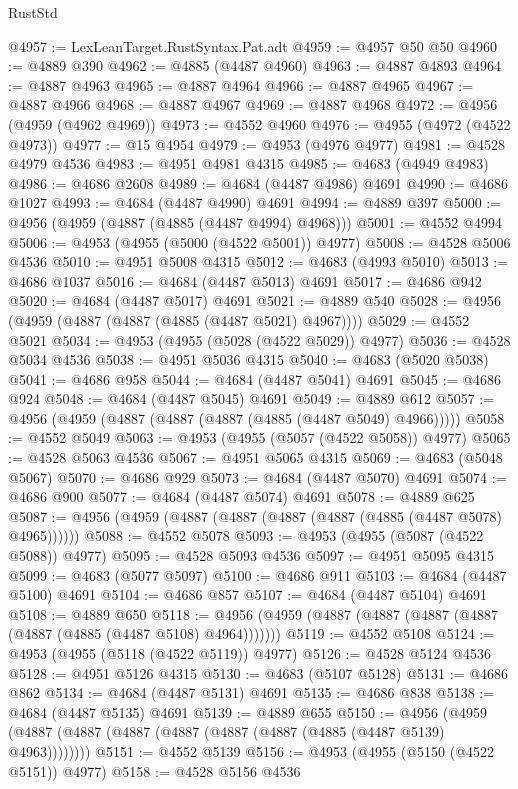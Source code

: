 \begin{lexlean}{RustStd}
\begin{coremodule}
@4957 := LexLeanTarget.RustSyntax.Pat.adt
@4959 := @4957 @50 @50
@4960 := @4889 @390
@4962 := @4885 (@4487 @4960)
@4963 := @4887 @4893
@4964 := @4887 @4963
@4965 := @4887 @4964
@4966 := @4887 @4965
@4967 := @4887 @4966
@4968 := @4887 @4967
@4969 := @4887 @4968
@4972 := @4956 (@4959 (@4962 @4969))
@4973 := @4552 @4960
@4976 := @4955 (@4972 (@4522 @4973))
@4977 := @15 @4954
@4979 := @4953 (@4976 @4977)
@4981 := @4528 @4979 @4536
@4983 := @4951 @4981 @4315
@4985 := @4683 (@4949 @4983)
@4986 := @4686 @2608
@4989 := @4684 (@4487 @4986) @4691
@4990 := @4686 @1027
@4993 := @4684 (@4487 @4990) @4691
@4994 := @4889 @397
@5000 := @4956 (@4959 (@4887 (@4885 (@4487 @4994) @4968)))
@5001 := @4552 @4994
@5006 := @4953 (@4955 (@5000 (@4522 @5001)) @4977)
@5008 := @4528 @5006 @4536
@5010 := @4951 @5008 @4315
@5012 := @4683 (@4993 @5010)
@5013 := @4686 @1037
@5016 := @4684 (@4487 @5013) @4691
@5017 := @4686 @942
@5020 := @4684 (@4487 @5017) @4691
@5021 := @4889 @540
@5028 := @4956 (@4959 (@4887 (@4887 (@4885 (@4487 @5021) @4967))))
@5029 := @4552 @5021
@5034 := @4953 (@4955 (@5028 (@4522 @5029)) @4977)
@5036 := @4528 @5034 @4536
@5038 := @4951 @5036 @4315
@5040 := @4683 (@5020 @5038)
@5041 := @4686 @958
@5044 := @4684 (@4487 @5041) @4691
@5045 := @4686 @924
@5048 := @4684 (@4487 @5045) @4691
@5049 := @4889 @612
@5057 := @4956 (@4959 (@4887 (@4887 (@4887 (@4885 (@4487 @5049) @4966)))))
@5058 := @4552 @5049
@5063 := @4953 (@4955 (@5057 (@4522 @5058)) @4977)
@5065 := @4528 @5063 @4536
@5067 := @4951 @5065 @4315
@5069 := @4683 (@5048 @5067)
@5070 := @4686 @929
@5073 := @4684 (@4487 @5070) @4691
@5074 := @4686 @900
@5077 := @4684 (@4487 @5074) @4691
@5078 := @4889 @625
@5087 := @4956 (@4959 (@4887 (@4887 (@4887 (@4887 (@4885 (@4487 @5078) @4965))))))
@5088 := @4552 @5078
@5093 := @4953 (@4955 (@5087 (@4522 @5088)) @4977)
@5095 := @4528 @5093 @4536
@5097 := @4951 @5095 @4315
@5099 := @4683 (@5077 @5097)
@5100 := @4686 @911
@5103 := @4684 (@4487 @5100) @4691
@5104 := @4686 @857
@5107 := @4684 (@4487 @5104) @4691
@5108 := @4889 @650
@5118 := @4956 (@4959 (@4887 (@4887 (@4887 (@4887 (@4887 (@4885 (@4487 @5108) @4964)))))))
@5119 := @4552 @5108
@5124 := @4953 (@4955 (@5118 (@4522 @5119)) @4977)
@5126 := @4528 @5124 @4536
@5128 := @4951 @5126 @4315
@5130 := @4683 (@5107 @5128)
@5131 := @4686 @862
@5134 := @4684 (@4487 @5131) @4691
@5135 := @4686 @838
@5138 := @4684 (@4487 @5135) @4691
@5139 := @4889 @655
@5150 := @4956 (@4959 (@4887 (@4887 (@4887 (@4887 (@4887 (@4887 (@4885 (@4487 @5139) @4963))))))))
@5151 := @4552 @5139
@5156 := @4953 (@4955 (@5150 (@4522 @5151)) @4977)
@5158 := @4528 @5156 @4536

\end{coremodule}
\end{lexlean}
